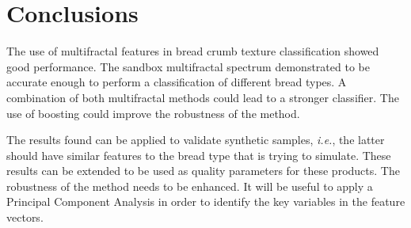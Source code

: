 \documentclass[oneside,a4paper,english,links]{article}
\begin{document}
\section{Conclusions}
The use of multifractal features in bread crumb texture classification showed good performance. The sandbox multifractal spectrum demonstrated to be accurate enough to perform a classification of different bread types. A combination of both multifractal methods could lead to a stronger classifier. The use of boosting could improve the robustness of the method.

The results found can be applied to validate synthetic samples, {\em i.e.}, the latter should have similar features to the bread type that is trying to simulate. These results can be extended to be used as quality parameters for these products. The robustness of the method needs to be enhanced. It will be useful to apply a Principal Component Analysis in order to identify the key variables in the feature vectors. 




\end{document}
